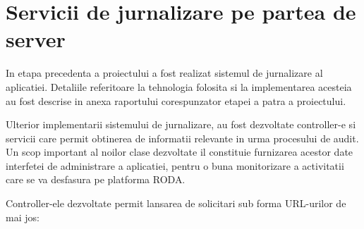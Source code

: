 \section{Servicii de jurnalizare pe partea de server}

In etapa precedenta a proiectului a fost realizat sistemul de jurnalizare al aplicatiei. Detaliile referitoare la tehnologia folosita si la implementarea acesteia au fost descrise in anexa raportului corespunzator etapei a patra a proiectului.

Ulterior implementarii sistemului de jurnalizare, au fost dezvoltate controller-e si servicii care permit obtinerea de informatii relevante in urma procesului de audit. Un scop important al noilor clase dezvoltate il constituie furnizarea acestor date interfetei de administrare a aplicatiei, pentru o buna monitorizare a activitatii care se va desfasura pe platforma RODA.

Controller-ele dezvoltate permit lansarea de solicitari sub forma URL-urilor de mai jos:

